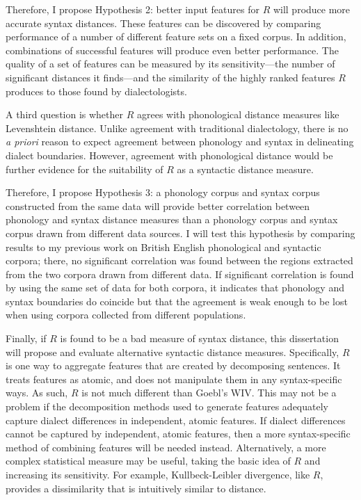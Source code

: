 Therefore, I propose Hypothesis 2: better input features
for $R$ will produce more accurate syntax
distances. These features can be discovered by comparing performance
of a number of different feature sets on a fixed corpus. In addition,
combinations of successful features will produce even better
performance.
The quality of a set of features can be
measured by its sensitivity---the number of significant distances it
finds---and the similarity of the highly ranked features $R$ produces
to those found by dialectologists.

A third question is whether $R$ agrees with phonological distance
measures like Levenshtein distance. Unlike agreement with traditional
dialectology, there is no {\it a priori} reason to expect agreement
between phonology and syntax in delineating dialect
boundaries. However, agreement with phonological distance would be
further evidence for the suitability of $R$ as a syntactic distance
measure.

Therefore, I propose Hypothesis 3: a phonology corpus and syntax corpus
constructed from the same data will provide better correlation between
phonology and syntax distance measures than a phonology corpus and
syntax corpus drawn from different data sources. I will test this
hypothesis by comparing results to my previous work on British English
phonological and syntactic corpora; there, no significant correlation
was found between the regions extracted from the two corpora drawn
from different data. If significant correlation is found by using the
same set of data for both corpora, it indicates that phonology and
syntax boundaries do coincide but that the agreement is weak enough to
be lost when using corpora collected from different populations.

Finally, if $R$ is found to be a bad measure of syntax distance, this
dissertation will propose and evaluate alternative syntactic distance
measures. Specifically, $R$ is one way to aggregate features that are
created by decomposing sentences. It treats features as atomic, and
does not manipulate them in any syntax-specific ways. As such, $R$ is
not much different than Goebl's WIV. This may not be a problem if the
decomposition methods used to generate features adequately capture
dialect differences in independent, atomic features. If dialect
differences cannot be captured by independent, atomic features, then a
more syntax-specific method of combining features will be needed
instead. Alternatively, a more complex statistical measure may be
useful, taking the basic idea of $R$ and increasing its
sensitivity. For example, Kullbeck-Leibler divergence, like $R$,
provides a dissimilarity that is intuitively similar to distance.

